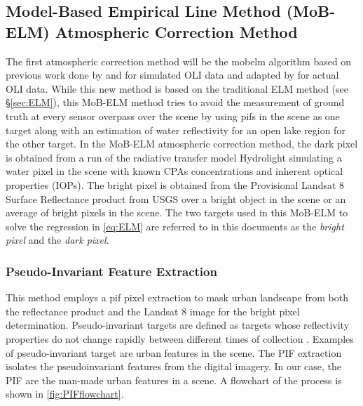 \subsection{Model-Based Empirical Line Method (MoB-ELM) Atmospheric Correction Method}
\label{subsec:mobelm}

The first atmospheric correction method will be the \gls{mobelm} algorithm based on previous work done by \citet{Gerace:2013} and \citet{Gerace:2012}  for simulated OLI data and adapted by \citet{Concha2014SPIE} for actual OLI data. While this new method is based on the traditional ELM method (see \S\ref{sec:ELM}), this MoB-ELM method tries to avoid the measurement of ground truth at every sensor overpass over the scene by using \glspl{pif} in the scene as one target along with an estimation of water reflectivity for an open lake region for the other target. In the MoB-ELM atmospheric correction method, the dark pixel is obtained from a run of the radiative transfer model Hydrolight \citep{MobleyHEtech} simulating a water pixel in the scene with known CPAs concentrations and inherent optical properties (IOPs). The bright pixel is obtained from the Provisional Landsat 8 Surface Reflectance product \citep{L8SurfProduct2015} from USGS over a bright object in the scene or an average of bright pixels in the scene. The two targets used in this MoB-ELM to solve the regression in \autoref{eq:ELM} are referred to in this documents as the {\it bright pixel}  and the {\it dark pixel}.

\subsubsection{Pseudo-Invariant Feature Extraction}

This method employs a \gls{pif} pixel extraction to mask urban landscape from both the reflectance product and the Landsat 8 image for the bright pixel determination. Pseudo-invariant targets are defined as targets whose reflectivity properties do not change rapidly between different times of collection  \citep{Schott:1988}. Examples of pseudo-invariant target are urban features in the scene.  The PIF extraction isolates the pseudoinvariant features from the digital imagery. In our case, the PIF are the man-made urban features in a scene. A flowchart of the process is shown in \autoref{fig:PIFflowchart}. 

